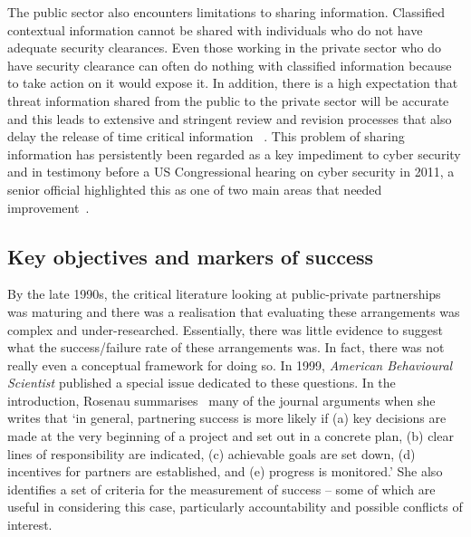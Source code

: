 \documentclass[a4paper,11pt]{article}
\begin{document}
The public sector also encounters limitations to sharing
information. Classified contextual information cannot be shared with
individuals who do not have adequate security clearances. Even those
working in the private sector who do have security clearance can often
do nothing with classified information because to take action on it
would expose it. In addition, there is a high expectation that threat
information shared from the public to the private sector will be
accurate and this leads to extensive and stringent review and revision
processes that also delay the release of time critical information
~\cite{usgao:2010}.  This problem of sharing information has
persistently been regarded as a key impediment to cyber security and
in testimony before a US Congressional hearing on cyber security in 2011,
a senior official highlighted this as one of two main areas that
needed improvement~\cite{wilshusen:2011}.

\subsection{Key objectives and markers of success}

By the late 1990s, the critical literature looking at public-private
partnerships was maturing and there was a realisation that evaluating
these arrangements was complex and under-researched. Essentially,
there was little evidence to suggest what the success/failure rate of
these arrangements was. In fact, there was not really even a
conceptual framework for doing so. In 1999, {\emph{American Behavioural
Scientist}} published a special issue dedicated to these questions. In
the introduction, Rosenau summarises~\cite{rosenau:1999} many of the
journal arguments when she writes that `in general, partnering success
is more likely if (a) key decisions are made at the very beginning of
a project and set out in a concrete plan, (b) clear lines of
responsibility are indicated, (c) achievable goals are set down, (d)
incentives for partners are established, and (e) progress is
monitored.' She also identifies a set of criteria for the measurement
of success -- some of which are useful in considering this case,
particularly accountability and possible conflicts of interest.   
\end{document}
